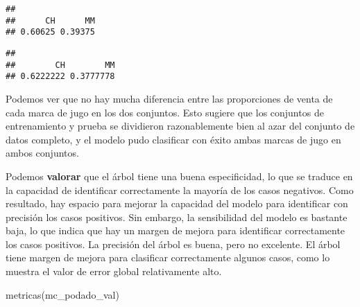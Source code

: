 \documentclass[
]{article}
\newenvironment{Shaded}{\begin{snugshade}}{\end{snugshade}}
\newcommand{\CommentTok}[1]{\textcolor[rgb]{0.56,0.35,0.01}{\textit{#1}}}
\newcommand{\FunctionTok}[1]{\textcolor[rgb]{0.00,0.00,0.00}{#1}}
\newcommand{\NormalTok}[1]{#1}
\newcommand{\SpecialCharTok}[1]{\textcolor[rgb]{0.00,0.00,0.00}{#1}}
\begin{document}
\begin{Shaded}
\end{Shaded}

\begin{verbatim}
## 
##      CH      MM 
## 0.60625 0.39375
\end{verbatim}

\begin{Shaded}
\end{Shaded}

\begin{verbatim}
## 
##        CH        MM 
## 0.6222222 0.3777778
\end{verbatim}

Podemos ver que no hay mucha diferencia entre las proporciones de venta
de cada marca de jugo en los dos conjuntos. Esto sugiere que los
conjuntos de entrenamiento y prueba se dividieron razonablemente bien al
azar del conjunto de datos completo, y el modelo pudo clasificar con
éxito ambas marcas de jugo en ambos conjuntos.

Podemos \textbf{valorar} que el árbol tiene una buena especificidad, lo
que se traduce en la capacidad de identificar correctamente la mayoría
de los casos negativos. Como resultado, hay espacio para mejorar la
capacidad del modelo para identificar con precisión los casos positivos.
Sin embargo, la sensibilidad del modelo es bastante baja, lo que indica
que hay un margen de mejora para identificar correctamente los casos
positivos. La precisión del árbol es buena, pero no excelente. El árbol
tiene margen de mejora para clasificar correctamente algunos casos, como
lo muestra el valor de error global relativamente alto.

\begin{Shaded}
\begin{Highlighting}[]
\FunctionTok{metricas}\NormalTok{(mc\_podado\_val)}
\end{Highlighting}
\end{Shaded}
\end{document}
